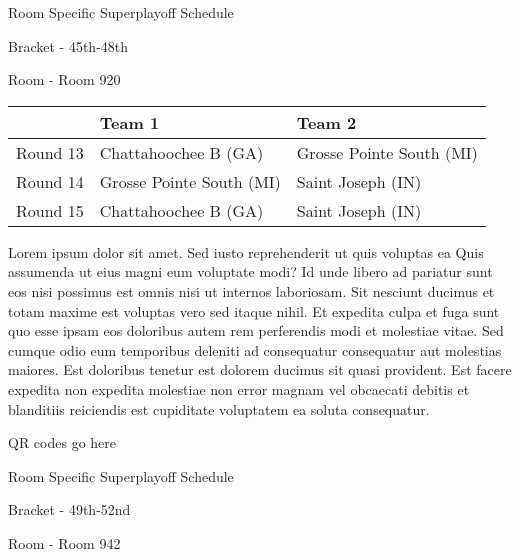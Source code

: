 \documentclass{article}%
\begin{document}
\newpage%
\begin{center}%
\begin{Huge}%
Room Specific Superplayoff Schedule%
\end{Huge}%
\vspace*{8pt}%
\linebreak%
\begin{Large}%
Bracket {-} 45th{-}48th%
\end{Large}%
\vspace*{8pt}%
\linebreak%
\vspace*{8pt}%
\begin{Large}%
Room {-} Room 920%
\end{Large}%
\end{center}%
%
\begin{tabularx}{\textwidth}{|c|Y|Y|}%
\hline%
&Team 1&Team 2\\%
\hline%
Round 13&Chattahoochee B (GA)&Grosse Pointe South (MI)\\%
Round 14&Grosse Pointe South (MI)&Saint Joseph (IN)\\%
Round 15&Chattahoochee B (GA)&Saint Joseph (IN)\\%
\hline%
\end{tabularx}%
\vspace*{8pt}%
\newline%
Lorem ipsum dolor sit amet. Sed iusto reprehenderit ut quis voluptas ea Quis assumenda ut eius magni eum voluptate modi? Id unde libero ad pariatur sunt eos nisi possimus est omnis nisi ut internos laboriosam. Sit nesciunt ducimus et totam maxime est voluptas vero sed itaque nihil. Et expedita culpa et fuga sunt quo esse ipsam eos doloribus autem rem perferendis modi et molestiae vitae.\newline%
\newline%
Sed cumque odio eum temporibus deleniti ad consequatur consequatur aut molestias maiores. Est doloribus tenetur est dolorem ducimus sit quasi provident. Est facere expedita non expedita molestiae non error magnam vel obcaecati debitis et blanditiis reiciendis est cupiditate voluptatem ea soluta consequatur.%
\vspace*{140pt}%
\begin{center}%
\begin{Huge}%
QR codes go here%
\end{Huge}%
\end{center}%
\newpage%
\begin{center}%
\begin{Huge}%
Room Specific Superplayoff Schedule%
\end{Huge}%
\vspace*{8pt}%
\linebreak%
\begin{Large}%
Bracket {-} 49th{-}52nd%
\end{Large}%
\vspace*{8pt}%
\linebreak%
\vspace*{8pt}%
\begin{Large}%
Room {-} Room 942%
\end{Large}%
\end{center}%
\end{document}
